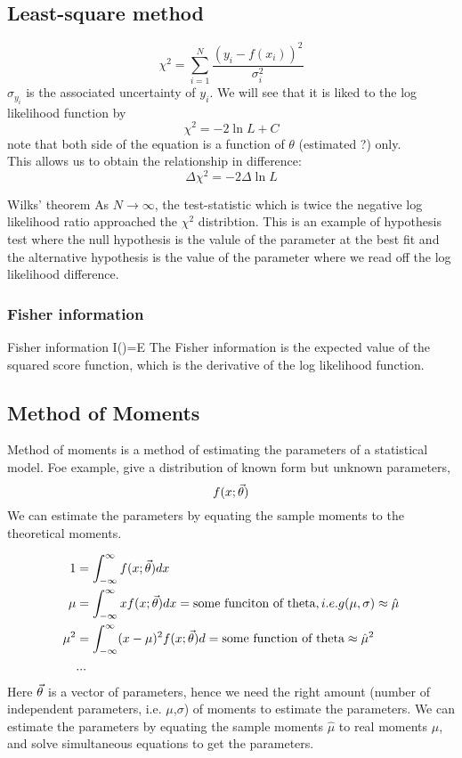 \documentclass[12pt,a4paper]{article}
\begin{document}
\subsection{Least-square method}
$$
\chi^2  = \sum_{i=1}^N \frac{(y_i - f(x_i))^2}{\sigma_i^2}
$$
$\sigma_{y_i}$ is the associated uncertainty of $y_i$.
We will see that it is liked to the log likelihood function by 
$$
\chi^2 = -2 \ln L + C
$$
note that both side of the equation is a function of $\theta$ (estimated ?) only.\\
This allows us to obtain the relationship in difference:
$$
{\Delta \chi^2}= -2  \Delta \ln L
$$
\begin{theorem}
    {Wilks' theorem}
    {As $N\rightarrow\infty $, the test-statistic which is twice the negative log likelihood ratio approached the $\chi^2$ distribtion. This is an example of hypothesis test where the null hypothesis is the valule of the parameter at the best fit and the alternative hypothesis is the value of the parameter where we read off the log likelihood difference.}
\end{theorem}
\subsubsection{Fisher information}
\begin{definition}
    {Fisher information}
    {I(\theta)=E}
    {The Fisher information is the expected value of the squared score function, which is the derivative of the log likelihood function.}
\end{definition}
\subsection{Method of Moments}
Method of moments is a method of estimating the parameters of a statistical model.
Foe example, give a distribution of known form but unknown parameters, $$f(x;\va{\theta})$$
We can estimate the parameters by equating the sample moments to the theoretical moments.

\begin{align}
    1 &= \int_{-\infty}^{\infty} f(x ; \va{\theta}) d x \\
    \mu &= \int_{-\infty}^{\infty} x f(x ; \va{\theta}) d x  = \text{some funciton of theta}, i.e. g(\mu,\sigma)\approx \hat{\mu} \\
    \mu^{2} &=\int_{-\infty}^{\infty}(x-\mu)^{2} f(x ; \va{\theta}) d = \text{some function of theta} \approx \hat{\mu}^{2} \\
    &...
\end{align}
Here $\va{\theta}$ is a vector of parameters, hence we need the right amount (number of independent parameters, i.e. $\mu$,$\sigma$) of moments to estimate the parameters.
We can estimate the parameters by equating the sample moments $\hat{\mu}$ to real moments $\mu$, and solve simultaneous equations to get the parameters.
\end{document}
